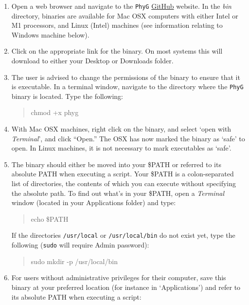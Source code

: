 \documentclass[11pt]{article}
\newcommand{\phyg}{\texttt{PhyG} }
\begin{document}
\begin{enumerate}
\item Open a web browser and navigate to the \phyg \href{https://github.com/amnh/PhyGraph}
{GitHub} website. In the \textit{bin} directory, binaries are available for Mac OSX 
computers with either Intel or M1 processors, and Linux (Intel) machines (see information 
relating to Windows machine below).

\item Click on the appropriate link for the binary. On most systems this will 
download to either your Desktop or Downloads folder. 

\item The user is advised to change the permissions of the binary to ensure
that it is executable. In a terminal window, navigate to the directory where the \phyg
binary is located. Type the following:

	\begin{quote}
	chmod +x phyg
	\end{quote}

\item With Mac OSX machines, right click on the binary, and select `open with 
\textit{Terminal}', and click ``Open.'' The OSX has now marked the binary as `safe' 
to open. In Linux machines, it is not necessary to mark executables as `safe'.

\item The binary should either be moved into your \$PATH or referred to its 
absolute PATH when executing a script. Your \$PATH is a colon-separated list 
of directories, the contents of which you can execute without specifying the 
absolute path. To find out what's in your \$PATH, open a \textit{Terminal} window 
(located in your Applications folder) and type: 

	\begin{quote}
	echo \$PATH
	\end{quote}

If the directories \texttt{/usr/local} or \texttt{/usr/local/bin} do not exist yet, type the 
following (\texttt{sudo} will require Admin password): 

	\begin{quote}
	sudo mkdir -p /usr/local/bin
	\end{quote}

\item For users without administrative privileges for their computer, save
this binary at your preferred location (for instance in `Applications') and refer to its 
absolute PATH when executing a script: 


\end{enumerate}
\end{document}
